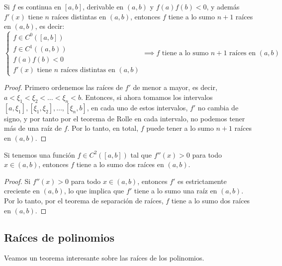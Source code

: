 \begin{teorema}
    Si $f$ es continua en $[a,b]$, derivable en $(a,b)$ y $f(a)f(b)<0$, y además $f'(x)$ tiene $n$ raíces distintas en $(a,b)$, entonces $f$ tiene a lo sumo $n+1$ raíces en $(a,b)$, es decir:
    \[
        \begin{cases}
            f\in C^0([a,b]) \\
            f\in C^1((a,b)) \\
            f(a)f(b)<0 \\
            f'(x) \text{ tiene } n \text{ raíces distintas en } (a,b)
        \end{cases}
        \implies
        f \text{ tiene a lo sumo } n+1 \text{ raíces en } (a,b)
    \]
\end{teorema}

\begin{proof}
    Primero ordenemos las raíces de $f'$ de menor a mayor, es decir, $a < \xi_1 < \xi_2 < \ldots < \xi_n < b$. Entonces, si ahora tomamos los intervalos $[a, \xi_1], [\xi_1, \xi_2], \ldots, [\xi_n, b]$, en cada uno de estos intervalos, $f'$ no cambia de signo, y por tanto por el teorema de Rolle en cada intervalo, no podemos tener más de una raíz de $f$. Por lo tanto, en total, $f$ puede tener a lo sumo $n+1$ raíces en $(a,b)$.
\end{proof}

\begin{corolario}
    Si tenemos una función $f \in C^2([a,b])$ tal que $f''(x) > 0$ para todo $x \in (a,b)$, entonces $f$ tiene a lo sumo dos raíces en $(a,b)$.
\end{corolario}

\begin{proof}
    Si $f''(x) > 0$ para todo $x \in (a,b)$, entonces $f'$ es estrictamente creciente en $(a,b)$, lo que implica que $f'$ tiene a lo sumo una raíz en $(a,b)$. Por lo tanto, por el teorema de separación de raíces, $f$ tiene a lo sumo dos raíces en $(a,b)$.
\end{proof}

\subsection{Raíces de polinomios}

Veamos un teorema interesante sobre las raíces de los polinomios.

